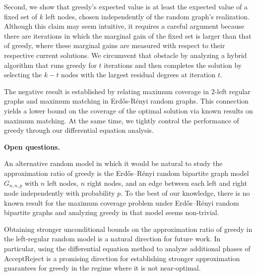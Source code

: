 \documentclass[10pt,a4paper]{article}
\begin{document}
Second, we show that greedy’s expected value is at least the expected value of a fixed set of $k$ left nodes, chosen independently of the random graph’s realization.
Although this claim may seem intuitive, it requires a careful argument because there are iterations in which the marginal gain of the fixed set is larger than that of greedy, where these marginal gains are measured with respect to their respective current solutions. We circumvent that obstacle by analyzing a hybrid algorithm that runs greedy for $t$ iterations and then completes the solution by selecting the $k-t$ nodes with the largest residual degrees at iteration $t$.\par




The negative result is established by relating maximum coverage in $2$-left regular graphs and maximum matching in Erdős-Rényi random graphs. This connection yields a lower bound on the coverage of the optimal solution via known results on maximum matching. At the same time, we tightly control the performance of greedy through our differential equation analysis.\par





\par\medskip\noindent\textbf{Open questions.}\par




An alternative random model in which it would be natural to study the approximation ratio of greedy is the Erdős–Rényi
random bipartite graph model $G_{n,n,p}$ with $n$ left nodes, $n$ right nodes, and an edge between each left and right node independently with probability $p$. To the best of our knowledge, there is no known result for the maximum coverage problem under Erdős–Rényi
random bipartite graphs and analyzing greedy in that model seems non-trivial.\par




Obtaining stronger unconditional bounds on the approximation ratio of greedy in the left-regular random model is a natural direction for future work. In particular, using the differential equation method to analyze additional phases of AcceptReject is a promising direction for establishing stronger approximation guarantees for greedy in the regime where it is not near-optimal.\par
\end{document}
